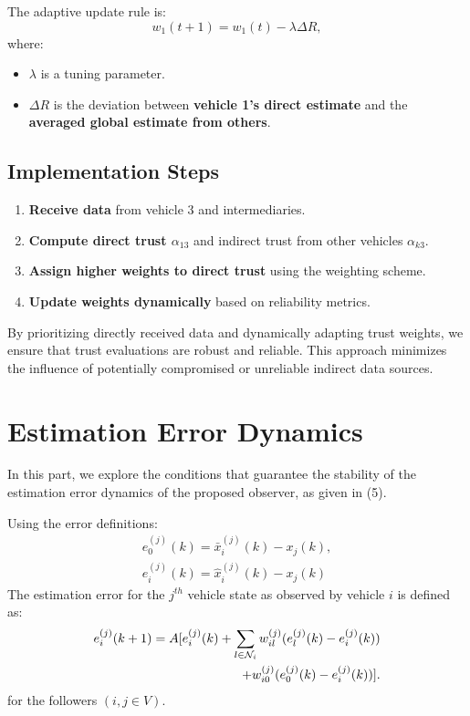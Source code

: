 \documentclass[letterpaper, 10pt, conference]{ieeeconf}  %
\begin{document}
The adaptive update rule is:
\[
w_1(t+1) = w_1(t) - \lambda \Delta R,
\]
where:
\begin{itemize}
    \item \( \lambda \) is a tuning parameter.
    \item \( \Delta R \) is the deviation between \textbf{vehicle 1's direct estimate} and the \textbf{averaged global estimate from others}.
\end{itemize}



\subsection{Implementation Steps}
\begin{enumerate}
    \item \textbf{Receive data} from vehicle 3 and intermediaries.
    \item \textbf{Compute direct trust \( \alpha_{13} \)} and indirect trust from other vehicles \( \alpha_{k3} \).
    \item \textbf{Assign higher weights to direct trust} using the weighting scheme.
    \item \textbf{Update weights dynamically} based on reliability metrics.
\end{enumerate}



By prioritizing directly received data and dynamically adapting trust weights, we ensure that trust evaluations are robust and reliable. This approach minimizes the influence of potentially compromised or unreliable indirect data sources.


\section{Estimation Error Dynamics}
In this part, we explore the conditions that guarantee the stability of the
estimation error dynamics of the proposed observer, as given in (5).

Using the error definitions:
\begin{align*}
e_0^{(j)}(k) = \bar{x}_i^{(j)}(k) - x_j(k),
\\
e_i^{(j)}(k) = \hat{x}_i^{(j)}(k) - x_j(k)
\end{align*}
The estimation error for the $j^{th}$ vehicle state as observed by vehicle $i$ is defined as:
\begin{align}
    e_i^{(j)}(k+1) = A[e_i^{(j)}(k) + \sum_{l \in \mathcal{N}_i} w_{il}^{(j)} (e_l^{(j)}(k) - e_i^{(j)}(k)) \notag \\
    + w_{i0}^{(j)}(e_0^{(j)}(k) - e_i^{(j)}(k))]. 
\end{align}
for the followers $( i, j \in V )$.
\end{document}
